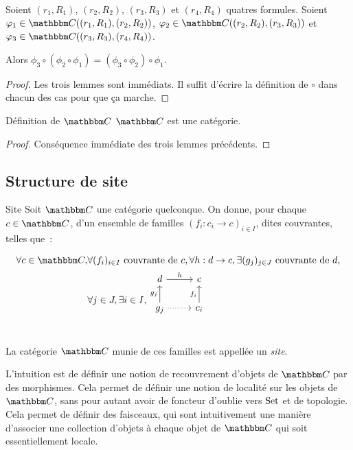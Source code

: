 \begin{lem}
    Soient $(r_1,R_1)$, $(r_2,R_2)$, $(r_3,R_3)$ et $(r_4,R_4)$ quatres formules.
    Soient $\phi_1\in\C((r_1,R_1), (r_2,R_2))$, $\phi_2\in\C((r_2,R_2), (r_3,R_3))$ et
    $\phi_3\in\C((r_3,R_3),(r_4,R_4))$.

    Alors $\phi_3\circ(\phi_2\circ\phi_1) = (\phi_3\circ\phi_2)\circ\phi_1$.
\end{lem}

\begin{proof} Les trois lemmes sont immédiats. Il suffit d'écrire la définition de $\circ$
    dans chacun des cas pour que ça marche.
\end{proof}

\begin{theo}{Définition de $\C$}
    $\C$ est une catégorie.
\end{theo}

\begin{proof} Conséquence immédiate des trois lemmes précédents.
\end{proof}
\subsection{Structure de site}

\begin{defi}{Site}
    Soit $\C$ une catégorie quelconque. On donne, pour
    chaque $c\in\C$, d'un ensemble de familles $(f_i : c_i\rightarrow c)_{i\in I}$,
    dites couvrantes, telles que~:

    \begin{align*}
        \forall c\in\C, & \forall (f_i)_{i\in I} \text{ couvrante de } c,
          \forall h : d\rightarrow c, \exists (g_j)_{j\in J} \text{ couvrante de } d, \\
        & \forall j\in J, \exists i\in I,
          \begin{tikzcd}[ampersand replacement=\&]
            d \arrow[r, "h"] \& c \\
            g_j \arrow[u, "g_j"] \arrow[r, dotted] \& c_i \arrow[u, "f_i"] \\
          \end{tikzcd}
    \end{align*}

    La catégorie $\C$ munie de ces familles est appellée un \emph{site}.
\end{defi}

L'intuition est de définir une notion de recouvrement d'objets de $\C$ par des morphismes.
Cela permet de définir une notion de localité sur les objets de $\C$, sans pour autant
avoir de foncteur d'oublie vers $\text{Set}$ et de topologie. Cela permet de définir des
faisceaux, qui sont intuitivement une manière d'associer une collection d'objets à
chaque objet de $\C$ qui soit essentiellement locale.

